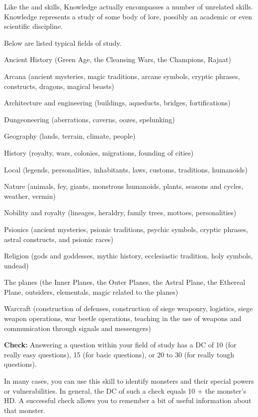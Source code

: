 Like the  and  skills, Knowledge actually encompasses a number of unrelated skills. Knowledge represents a study of some body of lore, possibly an academic or even scientific discipline.

Below are listed typical fields of study.

\begin{itemize*}
\item Ancient History (Green Age, the Cleansing Wars, the Champions, Rajaat)
\item Arcana (ancient mysteries, magic traditions, arcane symbols, cryptic phrases, constructs, dragons, magical beasts)
\item Architecture and engineering (buildings, aqueducts, bridges, fortifications)
\item Dungeoneering (aberrations, caverns, oozes, spelunking)
\item Geography (lands, terrain, climate, people)
\item History (royalty, wars, colonies, migrations, founding of cities)
\item Local (legends, personalities, inhabitants, laws, customs, traditions, humanoids)
\item Nature (animals, fey, giants, monstrous humanoids, plants, seasons and cycles, weather, vermin)
\item Nobility and royalty (lineages, heraldry, family trees, mottoes, personalities)
\item Psionics (ancient mysteries, psionic traditions, psychic symbols, cryptic phrases, astral constructs, and psionic races)
\item Religion (gods and goddesses, mythic history, ecclesiastic tradition, holy symbols, undead)
\item The planes (the Inner Planes, the Outer Planes, the Astral Plane, the Ethereal Plane, outsiders, elementals, magic related to the planes)
\item Warcraft (construction of defenses, construction of siege weaponry, logistics, siege weapon operations, war beetle operations, teaching in the use of weapons and communication through signals and messengers)
\end{itemize*}

\textbf{Check:} Answering a question within your field of study has a DC of 10 (for really easy questions), 15 (for basic questions), or 20 to 30 (for really tough questions).

In many cases, you can use this skill to identify monsters and their special powers or vulnerabilities. In general, the DC of such a check equals 10 + the monster's HD. A successful check allows you to remember a bit of useful information about that monster.


